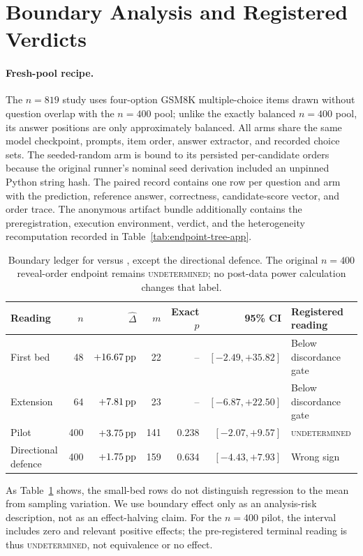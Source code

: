 \section{Boundary Analysis and Registered Verdicts}
\label{sec:boundary}

\paragraph{Fresh-pool recipe.}
The $n=819$ study uses four-option GSM8K multiple-choice items drawn without
question overlap with the $n=400$ pool; unlike the exactly balanced $n=400$
pool, its answer positions are only approximately balanced.  All arms share
the same model checkpoint, prompts, item order, answer extractor, and recorded
choice sets.  The seeded-random arm is bound to its persisted per-candidate
orders because the original runner's nominal seed derivation included an
unpinned Python string hash.  The paired record contains one row per question
and arm with the prediction, reference answer, correctness, candidate-score
vector, and order trace.  The anonymous artifact
bundle additionally contains the preregistration, execution environment,
verdict, and the heterogeneity recomputation recorded in
Table~\ref{tab:endpoint-tree-app}.

\begin{table}[H]
\centering
\small
\setlength{\tabcolsep}{4pt}
\caption{Boundary ledger for \sconf{} versus \rinj{}, except the directional
defence.  The original $n=400$ reveal-order endpoint remains
\textsc{undetermined}; no post-data power calculation changes that label.}
\label{tab:boundary-ledger}
\begin{tabular}{@{}lrrrrrp{}@{}}
\toprule
Reading & $n$ & $\widehat\Delta$ & $m$ & Exact $p$ & 95\% CI & Registered reading \\
\midrule
First bed & 48 & $+16.67\,\mathrm{pp}$ & 22 & -- & $[-2.49,+35.82]$ & Below discordance gate \\
Extension & 64 & $+7.81\,\mathrm{pp}$ & 23 & -- & $[-6.87,+22.50]$ & Below discordance gate \\
Pilot & 400 & $+3.75\,\mathrm{pp}$ & 141 & 0.238 & $[-2.07,+9.57]$ & \textsc{undetermined} \\
Directional defence & 400 & $+1.75\,\mathrm{pp}$ & 159 & 0.634 & $[-4.43,+7.93]$ & Wrong sign \\
\bottomrule
\end{tabular}
\end{table}

As Table~\ref{tab:boundary-ledger} shows, the small-bed rows do not distinguish
regression to the mean from sampling
variation.  We use boundary effect only as an analysis-risk description, not
as an effect-halving claim.  For the $n=400$ pilot, the interval includes zero
and relevant positive effects; the pre-registered terminal reading is thus
\textsc{undetermined}, not equivalence or no effect.

